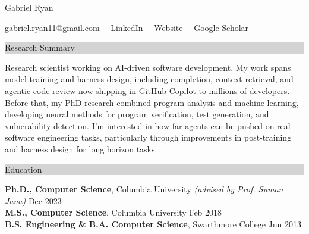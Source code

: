 \documentclass{article} %
\newcommand{\rsection}[1]{
  \hspace{-0.4cm}\vspace{0.1cm}
\colorbox{lightgrey}{
\begin{minipage}{1.07\linewidth}
\vspace{0.22cm}
\fontsize{14pt}{16pt}\selectfont #1
\vspace{0.12cm}
\end{minipage}
}
\vspace*{-0.1cm}
}
\newcommand{\rjob}[2]{
  \hspace*{-0.3cm}
{\fontsize{10pt}{12pt}\selectfont #1} \hfill #2
\hspace*{-1.2cm}
}
\begin{document}
\hspace*{-0.45cm}
{\fontsize{22pt}{22pt}\selectfont Gabriel Ryan}\\
\begin{minipage}{\linewidth}
\vspace{0.1cm}
  {\fontsize{11}{13}\selectfont
      \href{mailto:gabriel.ryan11@gmail.com}{gabriel.ryan11@gmail.com} \ \textbar\ \href{https://linkedin.com/in/gabrielryan1}{LinkedIn} \ \textbar\ \href{https://gryan11.github.io}{Website} \ \textbar\ \href{https://scholar.google.com/citations?user=6mW4eCcAAAAJ\&hl=en}{Google Scholar}
  }
\end{minipage}
\vspace{-0.15cm}

\rsection{Research Summary}

\begin{minipage}{\linewidth}
Research scientist working on AI-driven software development. My work spans model training and harness design, including completion, context retrieval, and agentic code review now shipping in GitHub Copilot to millions of developers. 
Before that, my PhD research combined program analysis and machine learning, developing neural methods for program verification, test generation, and vulnerability detection.
I'm interested in how far agents can be pushed on real software engineering tasks, particularly through improvements in post-training and harness design for long horizon tasks.
\end{minipage}
\vspace{0.15cm}

\rsection{Education}

\rjob{\textbf{Ph.D., Computer Science}, Columbia University \textit{(advised by Prof. Suman Jana)}}{Dec 2023}\\
\rjob{\textbf{M.S., Computer Science}, Columbia University}{Feb 2018}\\
\rjob{\textbf{B.S. Engineering \& B.A. Computer Science}, Swarthmore College}{Jun 2013}\\
\vspace{-0.05cm}
\end{document}
